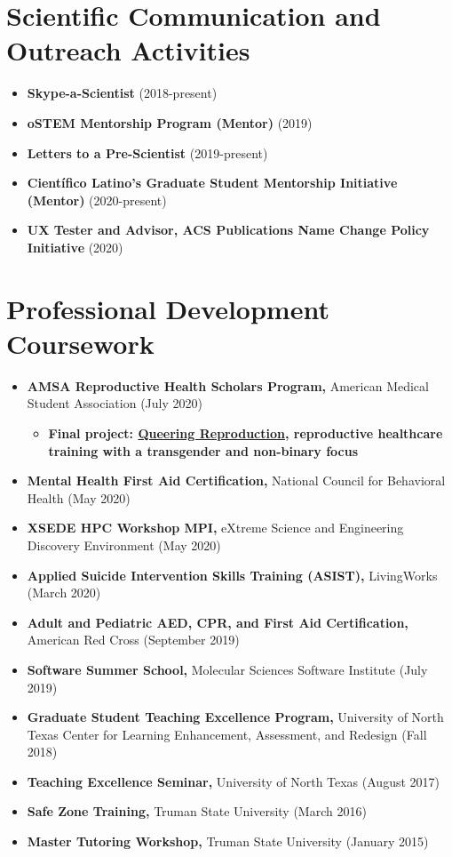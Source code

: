 \documentclass[letterpaper,11pt]{article}
\newcommand{\resumeItem}[2]{
  \item\small{
    \textbf{#1}{ #2 \vspace{-2pt}}
  }
}
\newcommand{\resumeSubItem}[2]{\resumeItem{#1}{#2}\vspace{-4pt}}
\newcommand{\resumeSubHeadingListStart}{\begin{itemize}[leftmargin=*]}
\newcommand{\resumeSubHeadingListEnd}{\end{itemize}}
\newcommand{\resumeItemListStart}{\begin{itemize}}
\newcommand{\resumeItemListEnd}{\end{itemize}\vspace{-5pt}}
\begin{document}
\section{Scientific Communication and Outreach Activities}
  \resumeSubHeadingListStart
   \resumeSubItem{Skype-a-Scientist}
      {(2018-present)}
    \resumeSubItem{oSTEM Mentorship Program (Mentor)}
      {(2019)}
    \resumeSubItem{Letters to a Pre-Scientist}
      {(2019-present)}
    \resumeSubItem{Cient\'{i}fico Latino's Graduate Student Mentorship Initiative (Mentor)}
      {(2020-present)}
    \resumeSubItem{UX Tester and Advisor, ACS Publications Name Change Policy Initiative}
      {(2020)}
  \resumeSubHeadingListEnd

\section{Professional Development Coursework}
  \resumeSubHeadingListStart
    \resumeSubItem{AMSA Reproductive Health Scholars Program\textnormal{,}}
      {American Medical Student Association (July 2020)}
      \resumeItemListStart
      \resumeItem{\textnormal{Final project: \href{https://queeringreproduction.com}{Queering Reproduction}, reproductive healthcare training with a transgender and non-binary focus}}
        {}
       \resumeItemListEnd
    \resumeSubItem{Mental Health First Aid Certification\textnormal{,}}
      {National Council for Behavioral Health (May 2020)}
    \resumeSubItem{XSEDE HPC Workshop MPI\textnormal{,}}
      {eXtreme Science and Engineering Discovery Environment (May 2020)}  
    \resumeSubItem{Applied Suicide Intervention Skills Training (ASIST)\textnormal{,}}
      {LivingWorks (March 2020)}
    \resumeSubItem{Adult and Pediatric AED, CPR, and First Aid Certification\textnormal{,}}
      {American Red Cross (September 2019)}
    \resumeSubItem{Software Summer School\textnormal{,}}
      {Molecular Sciences Software Institute (July 2019)}
    \resumeSubItem{Graduate Student Teaching Excellence Program\textnormal{,}}
      {University of North Texas Center for Learning Enhancement, Assessment, and Redesign (Fall 2018)}  
    \resumeSubItem{Teaching Excellence Seminar\textnormal{,}}
      {University of North Texas (August 2017)}
    \resumeSubItem{Safe Zone Training\textnormal{,}}
      {Truman State University (March 2016)}
    \resumeSubItem{Master Tutoring Workshop\textnormal{,}}
      {Truman State University (January 2015)}
  \resumeSubHeadingListEnd
\end{document}
